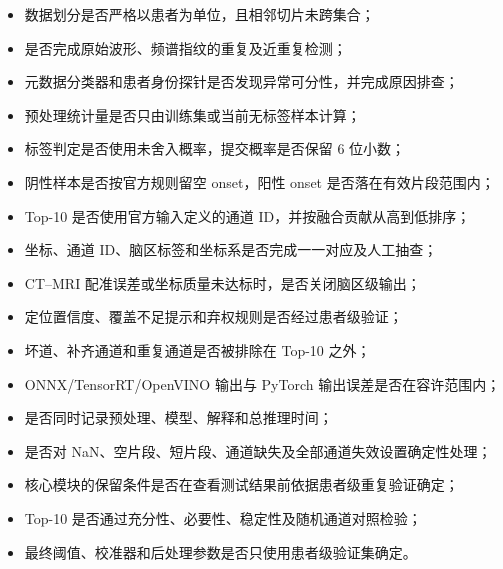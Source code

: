 \begin{itemize}[leftmargin=2em,itemsep=0.25em]
    \item 数据划分是否严格以患者为单位，且相邻切片未跨集合；
    \item 是否完成原始波形、频谱指纹的重复及近重复检测；
    \item 元数据分类器和患者身份探针是否发现异常可分性，并完成原因排查；
    \item 预处理统计量是否只由训练集或当前无标签样本计算；
    \item 标签判定是否使用未舍入概率，提交概率是否保留 6 位小数；
    \item 阴性样本是否按官方规则留空 onset，阳性 onset 是否落在有效片段范围内；
    \item Top-10 是否使用官方输入定义的通道 ID，并按融合贡献从高到低排序；
    \item 坐标、通道 ID、脑区标签和坐标系是否完成一一对应及人工抽查；
    \item CT--MRI 配准误差或坐标质量未达标时，是否关闭脑区级输出；
    \item 定位置信度、覆盖不足提示和弃权规则是否经过患者级验证；
    \item 坏道、补齐通道和重复通道是否被排除在 Top-10 之外；
    \item ONNX/TensorRT/OpenVINO 输出与 PyTorch 输出误差是否在容许范围内；
    \item 是否同时记录预处理、模型、解释和总推理时间；
    \item 是否对 NaN、空片段、短片段、通道缺失及全部通道失效设置确定性处理；
    \item 核心模块的保留条件是否在查看测试结果前依据患者级重复验证确定；
    \item Top-10 是否通过充分性、必要性、稳定性及随机通道对照检验；
    \item 最终阈值、校准器和后处理参数是否只使用患者级验证集确定。
\end{itemize}
